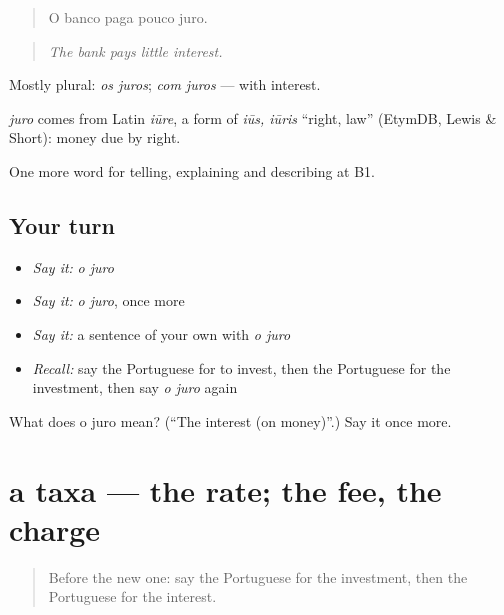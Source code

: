 \begin{quote}
O banco paga pouco juro.
\end{quote}

\begin{quote}
\emph{The bank pays little interest.}
\end{quote}

Mostly plural: \emph{os juros}; \emph{com juros} — with interest.

\begin{cousinweb}
\emph{juro} comes from Latin \emph{iūre}, a form of \emph{iūs, iūris} \textquotedblleft{}right, law\textquotedblright{} (EtymDB, Lewis \& Short): money due by right.
\end{cousinweb}

\begin{grammarlens}[title={What you've built}]
One more word for telling, explaining and describing at B1.
\end{grammarlens}

\subsection*{Your turn}
\begin{itemize}
\raggedright
  \item \emph{Say it:} \emph{o juro}
  \item \emph{Say it:} \emph{o juro}, once more
  \item \emph{Say it:} a sentence of your own with \emph{o juro}
  \item \emph{Recall:} say the Portuguese for to invest, then the Portuguese for the investment, then say \emph{o juro} again
\end{itemize}

\begin{tcolorbox}[breakable,colback=teal!4,colframe=teal!35!black,title={Before you move on}]
What does o juro mean? (\textquotedblleft{}The interest (on money)\textquotedblright{}.) Say it once more.
\end{tcolorbox}
\section[a taxa]{a taxa — the rate; the fee, the charge}

\label{lesson:PT-C392-taxa}



\begin{quote}
Before the new one: say the Portuguese for the investment, then the Portuguese for the interest.
\end{quote}

